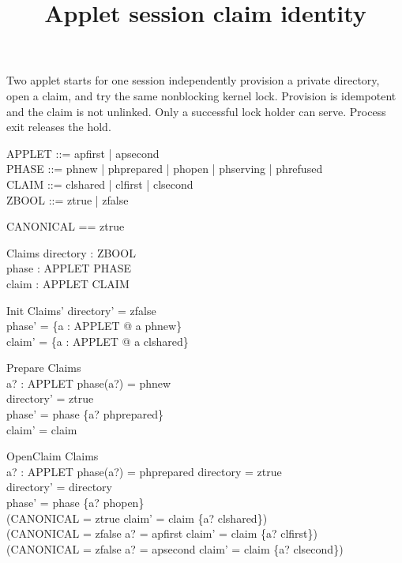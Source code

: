 \documentclass[a4paper,10pt]{article}
\begin{document}
\title{Applet session claim identity}
\maketitle

Two applet starts for one session independently provision a private
directory, open a claim, and try the same nonblocking kernel lock.
Provision is idempotent and the claim is not unlinked. Only a successful
lock holder can serve. Process exit releases the hold.

\begin{zed}
APPLET ::= apfirst | apsecond \\
PHASE ::= phnew | phprepared | phopen | phserving | phrefused \\
CLAIM ::= clshared | clfirst | clsecond \\
ZBOOL ::= ztrue | zfalse
\end{zed}

\begin{zed}
CANONICAL == ztrue
\end{zed}

\begin{schema}{Claims}
directory : ZBOOL \\
phase : APPLET \fun PHASE \\
claim : APPLET \fun CLAIM
\end{schema}

\begin{schema}{Init}
Claims'
\where
directory' = zfalse \\
phase' = \{a : APPLET @ a \mapsto phnew\} \\
claim' = \{a : APPLET @ a \mapsto clshared\}
\end{schema}

\begin{schema}{Prepare}
\Delta Claims \\
a? : APPLET
\where
phase(a?) = phnew \\
directory' = ztrue \\
phase' = phase \oplus \{a? \mapsto phprepared\} \\
claim' = claim
\end{schema}

\begin{schema}{OpenClaim}
\Delta Claims \\
a? : APPLET
\where
phase(a?) = phprepared \land directory = ztrue \\
directory' = directory \\
phase' = phase \oplus \{a? \mapsto phopen\} \\
(CANONICAL = ztrue \land claim' = claim \oplus \{a? \mapsto clshared\}) \\
\lor (CANONICAL = zfalse \land a? = apfirst \land
  claim' = claim \oplus \{a? \mapsto clfirst\}) \\
\lor (CANONICAL = zfalse \land a? = apsecond \land
  claim' = claim \oplus \{a? \mapsto clsecond\})
\end{schema}
\end{document}
